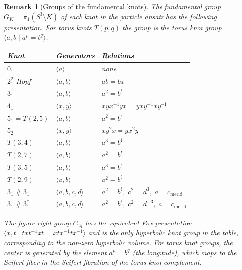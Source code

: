\documentclass[12pt,a4paper]{report}
\newtheorem{remark}[theorem]{Remark}
\providecommand{\DIFaddtex}[1]{{\protect\color{DIFgreen} \sf #1}} %
\providecommand{\DIFadd}[1]{\texorpdfstring{\DIFaddtex{#1}}{#1}} %
\begin{document}
\begin{remark}[Groups of the fundamental knots]
\DIFadd{\label{rem:knot-groups}
The fundamental group $G_K = \pi_1(S^3 \setminus K)$ of each knot in the
particle ansatz has the following presentation.  For torus knots
$T(p,q)$ the group is the \emph{torus knot group}
$\langle a, b \mid a^p = b^q \rangle$.
}

\medskip
{\renewcommand{\arraystretch}{1.3}
\begin{tabular}{lll}
\hline
\DIFadd{\textbf{Knot} }& \DIFadd{\textbf{Generators} }& \DIFadd{\textbf{Relations} }\\
\hline
\DIFadd{$0_1$ }& \DIFadd{$\langle a \rangle$ }& \DIFadd{none }\\
\DIFadd{$2^2_1$ Hopf }& \DIFadd{$\langle a, b \rangle$ }& \DIFadd{$ab = ba$ }\\
\DIFadd{$3_1$ }& \DIFadd{$\langle a, b \rangle$ }& \DIFadd{$a^2 = b^3$ }\\
\DIFadd{$4_1$ }& \DIFadd{$\langle x, y \rangle$ }& \DIFadd{$xyx^{-1}yx = yxy^{-1}xy^{-1}$ }\\
\DIFadd{$5_1 = T(2,5)$ }& \DIFadd{$\langle a, b \rangle$ }& \DIFadd{$a^2 = b^5$ }\\
\DIFadd{$5_2$ }& \DIFadd{$\langle x, y \rangle$ }& \DIFadd{$xy^2x = yx^2y$ }\\
\DIFadd{$T(3,4)$ }& \DIFadd{$\langle a, b \rangle$ }& \DIFadd{$a^3 = b^4$ }\\
\DIFadd{$T(2,7)$ }& \DIFadd{$\langle a, b \rangle$ }& \DIFadd{$a^2 = b^7$ }\\
\DIFadd{$T(3,5)$ }& \DIFadd{$\langle a, b \rangle$ }& \DIFadd{$a^3 = b^5$ }\\
\DIFadd{$T(2,9)$ }& \DIFadd{$\langle a, b \rangle$ }& \DIFadd{$a^2 = b^9$ }\\
\DIFadd{$3_1\mathbin{\#}3_1$ }& \DIFadd{$\langle a,b,c,d \rangle$
  }& \DIFadd{$a^2=b^3,\;c^2=d^3,\;a=c_{\mathrm{merid}}$ }\\
\DIFadd{$3_1\mathbin{\#}3_1^*$ }& \DIFadd{$\langle a,b,c,d \rangle$
  }& \DIFadd{$a^2=b^3,\;c^2=d^{-3},\;a=c_{\mathrm{merid}}$ }\\
\hline
\end{tabular}}

\medskip\noindent
\DIFadd{The figure-eight group $G_{4_1}$ has the equivalent Fox presentation
$\langle x,t \mid txt^{-1}xt = xtx^{-1}tx^{-1}\rangle$ and is the only
hyperbolic knot group in the table, corresponding to the non-zero
hyperbolic volume.  For torus knot groups, the center is generated by
the element $a^p = b^q$ (the longitude), which maps to the Seifert fiber
in the Seifert fibration of the torus knot complement.
}\end{remark}
\end{document}
